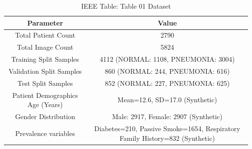 \begin{table}[htbp]
\caption{IEEE Table: Table 01 Dataset}
\label{tab:table_01_dataset}
\centering
\begin{tabular}{|c|c|}
\hline
Parameter & Value \\
\hline\hline
Total Patient Count & 2790 \\
\hline
Total Image Count & 5824 \\
\hline
Training Split Samples & 4112 (NORMAL: 1108, PNEUMONIA: 3004) \\
\hline
Validation Split Samples & 860 (NORMAL: 244, PNEUMONIA: 616) \\
\hline
Test Split Samples & 852 (NORMAL: 227, PNEUMONIA: 625) \\
\hline
Patient Demographics Age (Years) & Mean=12.6, SD=17.0 (Synthetic) \\
\hline
Gender Distribution & Male: 2917, Female: 2907 (Synthetic) \\
\hline
Prevalence variables & Diabetes=210, Passive Smoke=1654, Respiratory Family History=832 (Synthetic) \\
\hline
\end{tabular}
\end{table}
